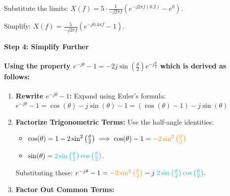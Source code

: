 \documentclass[11pt]{article}
\providecommand{\tightlist}{%
      \setlength{\itemsep}{0pt}\setlength{\parskip}{0pt}}
\begin{document}
Substitute the limits:
\(X(f) = 5 \cdot \frac{1}{-j 2 \pi f} \left( e^{-j 2 \pi f (0.2)} - e^{0} \right).\)

Simplify:
\(X(f) = \frac{5}{-j 2 \pi f} \left( e^{-j 0.4 \pi f} - 1 \right).\)

\paragraph{Step 4: Simplify Further}\label{step-4-simplify-further}

\paragraph{\texorpdfstring{\textbf{Using the property
\(e^{-j\theta} - 1 = -2j \sin\left(\frac{\theta}{2}\right) e^{-j\frac{\theta}{2}}\)}
which is derived as
follows:}{Using the property e\^{}\{-j\textbackslash theta\} - 1 = -2j \textbackslash sin\textbackslash left(\textbackslash frac\{\textbackslash theta\}\{2\}\textbackslash right) e\^{}\{-j\textbackslash frac\{\textbackslash theta\}\{2\}\} which is derived as follows:}}\label{using-the-property-e-jtheta---1--2j-sinleftfractheta2right-e-jfractheta2-which-is-derived-as-follows}

\begin{enumerate}
\def\labelenumi{\arabic{enumi}.}
\item
  \textbf{Rewrite \(e^{-j\theta} - 1\):} Expand using Euler's formula:
  \(e^{-j\theta} - 1 = \cos(\theta) - j\sin(\theta) - 1 =  (\cos(\theta) -1 ) - j\sin(\theta)\)
\item
  \textbf{Factorize Trigonometric Terms:} Use the half-angle identities:

  \begin{itemize}
  \tightlist
  \item
    \(\cos(\theta) = 1 -2\sin^2\left(\frac{\theta}{2}\right) \implies  \cos(\theta) - 1 = \color{orange}-2\sin^2\left(\frac{\theta}{2}\right)\)
  \item
    \(\sin(\theta) = \color{cyan}2\sin\left(\frac{\theta}{2}\right)\cos\left(\frac{\theta}{2}\right)\).
  \end{itemize}

  Substituting these:
  \(e^{-j\theta} - 1 = {\color{orange}-2\sin^2\left(\frac{\theta}{2}\right)} - j {\color{cyan}\cdot 2\sin\left(\frac{\theta}{2}\right)\cos\left(\frac{\theta}{2}\right)}.\)
\item
  \textbf{Factor Out Common Terms:}
\end{enumerate}
\end{document}
